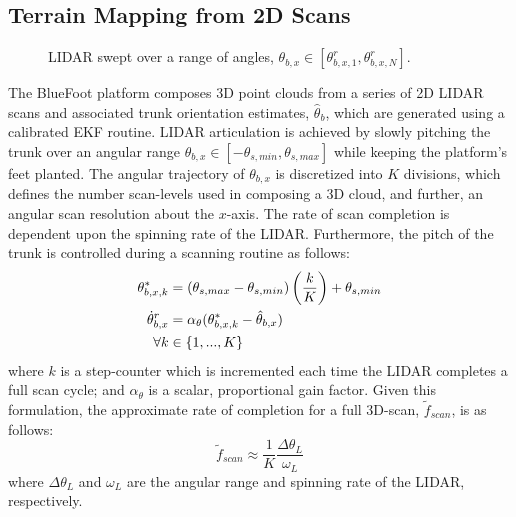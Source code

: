 		\subsection{Terrain Mapping from 2D Scans}
			\label{ssec::terrain_mapping}
			\begin{figure}[!h]
				\centering
				\caption{LIDAR swept over a range of angles, $\theta_{b,x} \in [\theta_{b,x,1}^{r},\theta_{b,x,N}^{r}]$. }
				\label{fig::sensor_sweep}
			\end{figure}
			The BlueFoot platform composes 3D point clouds from a series of 2D LIDAR scans and associated trunk orientation estimates, $\hat{\theta}_{b}$, which are generated using a calibrated EKF routine. LIDAR articulation is achieved by slowly pitching the trunk over an angular range $\theta_{b,x}\in[-\theta_{s,min},\theta_{s,max}]$ while keeping the platform's feet planted. The angular trajectory of $\theta_{b,x}$ is discretized into $K$ divisions, which defines the number scan-levels used in composing a 3D cloud, and further, an angular scan resolution about the $x$-axis. The rate of scan completion is dependent upon the spinning rate of the LIDAR. Furthermore, the pitch of the trunk is controlled during a scanning routine as follows:
				\begin{equation}
					\begin{split}
					\theta_{b,x,k}^{*} &= 
						\left(\theta_{s,max}-\theta_{s,min}\right)
							\left(\frac{k}{K}\right) + 
								\theta_{s,min} \\
					\dot{\theta}_{b,x}^{r} &=
						\alpha_{\theta}
							(\theta_{b,x,k}^{*} - \hat{\theta}_{b,x} ) \\
							\forall k &\in \{1,...,K\}
					\end{split}
				\end{equation}
			where $k$ is a step-counter which is incremented each time the LIDAR completes a full scan cycle; and $\alpha_{\theta}$ is a scalar, proportional gain factor. Given this formulation, the approximate rate of completion for a full 3D-scan, $\tilde{f}_{scan}$, is as follows:
				\begin{equation}
					\tilde{f}_{scan}\approx\frac{1}{K}\frac{\Delta\theta_{L}}{\omega_{L}}
					\label{eq::point_cloud_collection_rate}
				\end{equation}
			where $\Delta\theta_{L}$ and $\omega_{L}$ are the angular range and spinning rate of the LIDAR, respectively.

